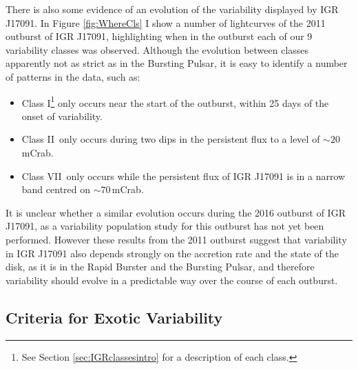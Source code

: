 \par There is also some evidence of an evolution of the variability displayed by IGR J17091.  In Figure \ref{fig:WhereCls} I show a number of lightcurves of the 2011 outburst of IGR J17091, highlighting when in the outburst each of our 9 variability classes was observed.  Although the evolution between classes apparently not as strict as in the Bursting Pulsar, it is easy to identify a number of patterns in the data, such as:
\begin{itemize}
\item Class I\indexi\footnote{See Section \ref{sec:IGRclassesintro} for a description of each class.} only occurs near the start of the outburst, within 25 days of the onset of variability.
\item Class II\indexii\ only occurs during two dips in the persistent flux to a level of $\sim20$\,mCrab.
\item Class VII\indexvii\ only occurs while the persistent flux of IGR J17091 is in a narrow band centred on $\sim70$\,mCrab.
\end{itemize}
It is unclear whether a similar evolution occurs during the 2016 outburst of IGR J17091, as a variability population study for this outburst has not yet been performed.  However these results from the 2011 outburst suggest that variability in IGR J17091 also depends strongly on the accretion rate and the state of the disk, as it is in the Rapid Burster and the Bursting Pulsar, and therefore variability should evolve in a predictable way over the course of each outburst.

\subsection{Criteria for Exotic Variability}

\label{sec:criteria}

